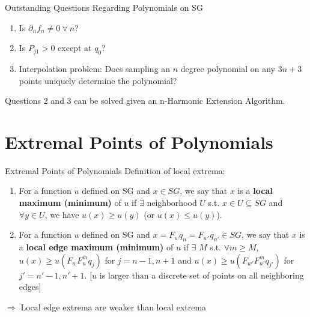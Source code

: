\documentclass[xcolor = dvipsnames]{beamer}
\begin{document}
\begin{frame}{Outstanding Questions Regarding Polynomials on SG}
    \begin{enumerate}
        \item Is $\partial_nf_n \neq 0 \ \forall \ n$?
        \item Is $P_{j1} > 0$ except at $q_0$?
        \item Interpolation problem: Does sampling an $n$ degree polynomial on any $3n + 3$ points uniquely determine the polynomial? 
    \end{enumerate}
    Questions 2 and 3 can be solved given an n-Harmonic Extension Algorithm.
\end{frame}

\section{Extremal Points of Polynomials}
\begin{frame}{Extremal Points of Polynomials}
    \pause
    Definition of local extrema:
    \begin{enumerate}
        \item For a function $u$ defined on SG and $x\in SG$, we say that $x$ is a \textbf{local maximum (minimum)} of $u$ if $\exists$ neighborhood $U$ s.t. $x\in U\subseteq SG$ and $\forall y\in U$, we have $u(x)\geq u(y)$ (or $u(x)\leq u(y)$).
        \vspace{10pt}
        \item For a function $u$ defined on SG and $x=F_{w}q_{n}=F_{w'}q_{n'}\in SG$, we say that $x$ is a \textbf{local edge maximum (minimum)} of $u$ if $\exists$ $M$ s.t. $\forall m\geq M$, $u(x)\geq u(F_{w}F_{n}^{m}q_{j})$ for $j=n-1,n+1$ and $u(x)\geq u(F_{w'}F_{n'}^{m}q_{j'})$ for $j'=n'-1, n'+1$. [$u$ is larger than a discrete set of points on all neighboring edges]
    \end{enumerate}
    
    \vspace{10pt}
    
    $\Rightarrow$ Local edge extrema are weaker than local extrema
\end{frame}
\end{document}
